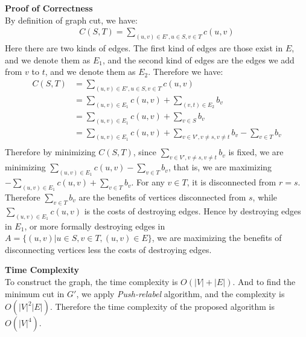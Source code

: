 \documentclass{article}
\newcommand{\Complexity}{\vspace{0.3cm} \noindent\textbf{Time Complexity} \vspace{0.2cm} \\}
\newcommand{\Proof}{\vspace{0.3cm} \noindent\textbf{Proof of Correctness} \vspace{0.2cm} \\}
\begin{document}
\Proof
By definition of graph cut, we have:
\begin{align}
  C(S, T) = \sum_{(u, v) \in E', u \in S, v\in T} c(u, v)
\end{align}
Here there are two kinds of edges. The first kind of edges are those exist in $E$, and we denote
them as $E_1$, and the second kind of edges are the edges we add from $v$ to $t$, and we denote them
as $E_2$. Therefore we have:
\begin{align}
  C(S, T) & = \sum_{(u, v) \in E', u \in S, v\in T} c(u, v) \\
  & = \sum_{(u, v) \in E_1} c(u, v) + \sum_{(v, t) \in E_2} b_v \\
  & = \sum_{(u, v) \in E_1} c(u, v) + \sum_{v \in S} b_v \\
  & = \sum_{(u, v) \in E_1} c(u, v) + \sum_{v \in V', v \neq s, v \neq t} b_v  - \sum_{v \in T} b_v \\
\end{align}
Therefore by minimizing $C(S, T)$, since $\sum_{v \in V', v \neq s, v \neq t} b_v$ is fixed,  
we are minimizing $ \sum_{(u, v) \in E_1} c(u, v) - \sum_{v \in T} b_v$, that is, we are maximizing 
$ -\sum_{(u, v) \in E_1} c(u, v) + \sum_{v \in T} b_v$. For any $v \in T$, it is disconnected from
$r = s$. Therefore $\sum_{v \in T} b_v$ are the benefits of vertices disconnected from $s$, while
$\sum_{(u, v) \in E_1} c(u, v)$ is the costs of destroying edges. Hence by destroying edges in 
$E_1$, or more formally destroying edges in  $A = \{(u, v) | u \in S, v\in T, (u, v) \in E\}$, we are
maximizing the benefits of disconnecting vertices less the costs of destroying edges.  

\Complexity
To construct the graph, the time complexity is $O(|V| + |E|)$. And to find the minimum cut in $G'$,
we apply \textit{Push-relabel} algorithm, and the complexity is $O(|V|^2|E|)$. Therefore the time
complexity of the proposed algorithm is $O(|V|^4)$.
\end{document}
